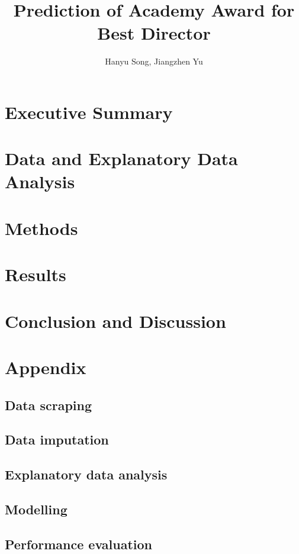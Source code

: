\documentclass[12pt]{article}
\title{Prediction of Academy Award for Best Director}
\author{Hanyu Song, Jiangzhen Yu}
\begin{document}
\maketitle
\section{Executive Summary} %
\section{Data and Explanatory Data Analysis} %
\section{Methods}
\section{Results}
\section{Conclusion and Discussion}
\section{Appendix}
\subsection{Data scraping}
\subsection{Data imputation}
\subsection{Explanatory data analysis}
\subsection{Modelling}
\subsection{Performance evaluation}
\end{document}
